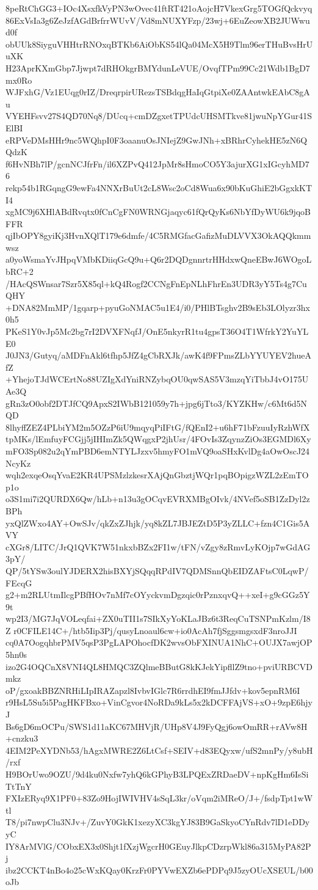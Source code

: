 8peRtChGG3+IOc4XsxfkVyPN3wOvec41ftRT421oAojcH7VkexGrg5TOGfQckvyq
86ExVsIa3g6ZeJzfAGdBrfrrWUvV/Vd8mNUXYFzp/23wj+6EuZeowXB2JUWwud0f
obUUk8SiyguVHHtrRNOxqBTKb6AiObKS54lQa04McX5H9Tlm96erTHuBvsHrUuXK
H23AprKXmGbp7Jjwpt7dRHOkgrBMYdunLeVUE/OvqfTPm99Cc21Wdb1BgD7mx0Ro
WJFxhG/Vz1EUqg0rIZ/DreqrpirURezsTSBdqgHaIqGtpiXe0ZAAntwkEAbC8gAu
VYEHFsvv27S4QD70Nq8/DUcq+cmDZgxetTPUdcUHSMTkve81jwuNpYGur41SElBI
eRPVeDMsHHr9nc5WQhpI0F3oaanuOsJNIejZ9GwJNh+xBRhrCyhekHE5zN6QQdzK
f6HvNBh7lP/gcnNCJfrFn/il6XZPvQ412JpMr8sHmoCO5Y3ajurXG1xIGcyhMD76
rekp54b1RGqngG9ewFa4NNXrBuUt2cL8Wsc2oCd8Wua6x90bKuGhiE2bGgxkKTI4
xgMC9j6XHlABdRvqtx0fCnCgFN0WRNGjaqyc61fQrQyKs6NbYfDyWU6k9jqoBFFR
qjIbOPY8gyiKj3HvnXQlT179e6dmfe/4C5RMGfacGafizMuDLVVX3OkAQQkmmwsz
a0yoWsmaYvJHpqVMbKDiiqGcQ9u+Q6r2DQDgnnrtrHHdxwQneEBwJ6WOgoLbRC+2
/HAcQSWnsar7Szr5X85ql+kQ4Rogf2CCNgFnEpNLhFhrEn3UDR3yY5Ts4g7CuQHY
+DNA82MmMP/1gqarp+pyuGoNMAC5u1E4/i0/PHlBTsghv2B9sEb3LOlyzr3hx0h5
PKeS1Y0vJp5Mc2bg7rI2DVXFNqfJ/OnE5nkyrR1tu4gpsT36O4T1WfrkY2YuYLE0
J0JN3/Gutyq/aMDFnAkl6tfhp5JfZ4gCbRXJk/awK4f9FPmsZLbYYUYEV2hueAfZ
+YhejoTJdWCErtNo88UZIgXdYniRNZybqOU0qwSAS5V3mzqYiTbbJ4vO175UAe3Q
gRn3zO0obf2DTJfCQ9ApxS2IWbB121059y7h+jpg6jTto3/KYZKHw/c6Mt6d5NQD
8lhyffZEZ4PLbiYM2m5OZzP6iU9mqyqPiIFtG/fQEnI2+u6hF71bFzuuIyRzhWfX
tpMKs/lEmfuyFCGjj5jIHImZk5QWqgxP2jhUsr/4FOvIs3ZqynzZiOs3EGMDl6Xy
mFO3Sp082u2qYmPBD6emNTYLJzxv5hmyFO1mVQ9oaSHxKvlDg4aOwOscJ24NcyKz
wqh2exqeOsqYvaE2KR4UPSMzlzkesrXAjQnGbztjWQr1pqBOpigzWZL2zEmTOp1o
o3S1mi7i2QURDX6Qw/hLb+n13u3gOCqvEVRXMBgOIvk/4NVef5oSB1ZzDyl2zBPh
yxQlZWxo4AY+OwSJv/qkZxZJhjk/yq8kZL7JBJEZtD5P3yZLLC+fzn4C1Gis5AVY
cXGr8/LITC/JrQ1QVK7W51nkxbBZx2FI1w/tFN/vZgy8zRmvLyKOjp7wGdAG3pY/
QP/5tYSw3oulYJDERX2hisBXYjSQqqRPdIV7QDMSnnQbEIDZAFtsC0LqwP/FEcqG
g2+m2RLUtmIlcgPBfHOv7nMf7cOYyckvmDgzqic0rPznxqvQ++xeI+g9cGGz5Y9t
wp2I3/MG7JqVOLeqfai+ZX0uTII1s7SIkXyYoKLaJBz6t3ReqCuTSNPmKzlm/I8Z
r0CFILE14C+/htb5Iip3Pj/qusyLnoaul6cw+io0AcAh7fjSggsmgsxdF3nroJJI
cq0A7OogqhbrPMV5qsP3PgLAPOhocfDK2wvsObFXINUA1NhC+OUJX7awjOP5hn0s
izo2G4OQCnX8VNI4QL8HMQC3ZQlmeBButG8kKJekYipfllZ9tno+pviURBCVDmkz
oP/gxoakBBZNRHiLIpIRAZapzl8IvbvIGlc7R6rrdhEI9fmJJfdv+kov5epnRM6I
r9HsL5Su5i5PagHKFBxo+VinCgvor4NoRDa9kLs5x2kDCFFAjVS+xO+9zpE6hjyJ
Bs6gD6mOCPu/SWS1d11aKC67MHVjR/UHp8V4J9FyQgj6owOmRR+rAVw8H+cnzku3
4EIM2PeXYDNb53/hAgxMWRE2Z6LtCsf+SEIV+d83EQyxw/ufS2mnPy/y8ubH/rxf
H9BOrUwo9OZU/9d4ku0Nxfw7yhQ6kGPhyB3LPQExZRDaeDV+npKgHm6IsSiTtTnY
FXIzERyq9X1PF0+83Zo9HojIWIVHV4sSqL3kr/oVqm2iMReO/J+/fsdpTpt1wWtl
T8/pi7nwpClu3NJv+/ZuvY0GkK1xezyXC3kgYJ83B9GaSkyoCYnRdv7lD1eDDyyC
IY8ArMVlG/CObxEX3x0Shjt1fXzjWgcrH0GEuyJlkpCDzrpWkl86a315MyPA82Pj
ibz2CCKT4nBo4o25cWxKQay0KrzFr0PYVwEXZb6ePDPq9J5zyOUcXSEUL/b00oJb
